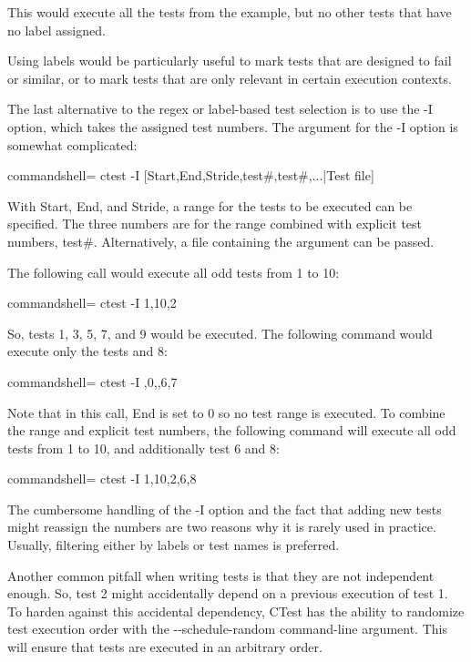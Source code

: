 This would execute all the tests from the example, but no other tests that have no label assigned.

Using labels would be particularly useful to mark tests that are designed to fail or similar, or to mark tests that are only relevant in certain execution contexts.

The last alternative to the regex or label-based test selection is to use the -I option, which takes the assigned test numbers. The argument for the -I option is somewhat complicated:

\begin{tcblisting}{commandshell={}}
ctest -I [Start,End,Stride,test#,test#,...|Test file]
\end{tcblisting}

With Start, End, and Stride, a range for the tests to be executed can be specified. The three numbers are for the range combined with explicit test numbers, test\#. Alternatively, a file containing the argument can be passed.

The following call would execute all odd tests from 1 to 10:

\begin{tcblisting}{commandshell={}}
ctest -I 1,10,2
\end{tcblisting}

So, tests 1, 3, 5, 7, and 9 would be executed. The following command would execute only the tests and 8:

\begin{tcblisting}{commandshell={}}
ctest -I ,0,,6,7
\end{tcblisting}

Note that in this call, End is set to 0 so no test range is executed. To combine the range and explicit test numbers, the following command will execute all odd tests from 1 to 10, and additionally test 6 and 8:

\begin{tcblisting}{commandshell={}}
ctest -I 1,10,2,6,8
\end{tcblisting}

The cumbersome handling of the -I option and the fact that adding new tests might reassign the numbers are two reasons why it is rarely used in practice. Usually, filtering either by labels or test names is preferred.

Another common pitfall when writing tests is that they are not independent enough. So, test 2 might accidentally depend on a previous execution of test 1. To harden against this accidental dependency, CTest has the ability to randomize test execution order with the -{}-schedule-random command-line argument. This will ensure that tests are executed in an arbitrary order.


